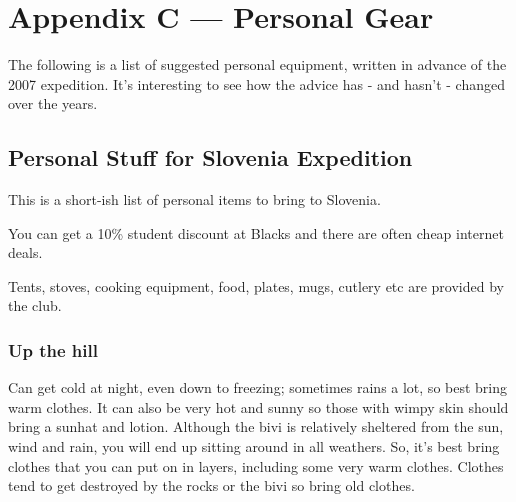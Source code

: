 \chapter{Appendix C --- Personal Gear}

The following is a list of suggested personal equipment, written in advance of the 2007 expedition. It's interesting to see how the advice has - and hasn't - changed over the years.


\section{Personal Stuff for Slovenia Expedition}

This is a short-ish list of personal items to bring to Slovenia.

You can get a 10\% student discount at Blacks and there are often cheap internet deals.

Tents, stoves, cooking equipment, food, plates, mugs, cutlery etc are provided by the club.


\subsection{Up the hill}
Can get cold at night, even down to freezing; sometimes rains a lot, so best bring warm clothes. It can also be very hot and sunny so those with wimpy skin should bring a sunhat and lotion. Although the bivi is relatively sheltered from the sun, wind and rain, you will end up sitting around in all weathers. So, it’s best bring clothes that you can put on in layers, including some very warm clothes. Clothes tend to get destroyed by the rocks or the bivi so bring old clothes.

